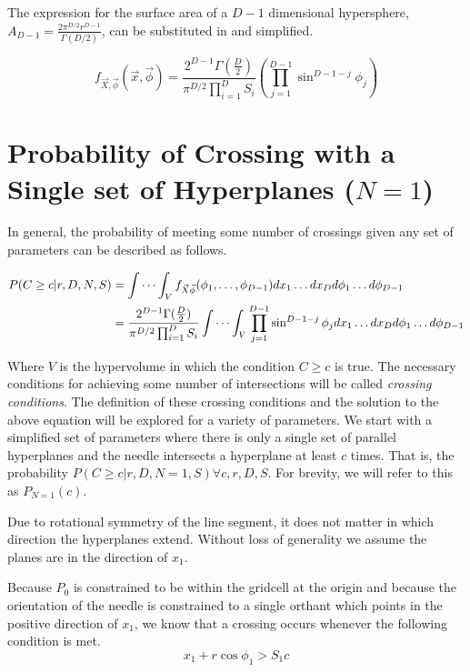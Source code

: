 \documentclass{article}
\begin{document}
The expression for the surface area of a $D-1$ dimensional hypersphere, $A_{D-1}=\frac{2\pi^{D/2}r^{D-1}}{\Gamma(D/2)}$,
can be substituted in and simplified.

\begin{equation}\label{eq:general pdf}
	f_{\vec{X},\vec{\phi}}(\vec{x}, \vec{\phi}) = \frac{2^{D-1}\Gamma(\frac{D}{2})}{\pi^{D/2}\prod_{i=1}^DS_i} \left(\prod_{j=1}^{D-1}\sin^{D-1-j}\phi_j\right)
\end{equation}

\section{Probability of Crossing with a Single set of Hyperplanes ($N=1$)} \label{s:n=1}
In general, the probability of meeting some number of crossings given any set of parameters can be described as follows.

\begin{align} 
	P(C\ge c|r, D, N, S)&=\idotsint_V f_{\vec{X}\vec\phi}(\phi_1,\hdots,\phi_{D-1})dx_1 \hdots dx_D d\phi_1 \hdots d\phi_{D-1} \label{eq:raw integral}\\
	&= \frac{2^{D-1}\Gamma(\frac{D}{2})}{\pi^{D/2}\prod_{i=1}^DS_i} \idotsint_V \prod_{j=1}^{D-1}\sin^{D-1-j}\phi_j dx_1\hdots dx_D d\phi_1 \hdots d\phi_{D-1} \label{eq:volume integral}
\end{align}

Where $V$ is the hypervolume in which the condition $C\ge c$ is true. The necessary conditions for achieving some number of intersections
will be called \emph{crossing conditions}. The definition of these crossing conditions and the solution to the above equation will be
explored for a variety of parameters.
We start with a simplified set of parameters where there is only a single set of parallel hyperplanes and the needle intersects a
hyperplane at least $c$ times. That is, the probability $P(C\ge c | r, D, N=1, S) \forall c, r, D, S$. For brevity, we will refer to this
as $P_{N=1}(c)$.

Due to rotational symmetry of the line segment, it does not matter in which direction the hyperplanes extend. Without loss of
generality we assume the planes are in the direction of $x_1$.

Because $P_0$ is constrained to be within the gridcell at the origin and because the orientation of the needle is constrained to a single
orthant which points in the positive direction of $x_1$, we know that a crossing occurs whenever the following condition is met.
\begin{equation}
	x_1 + r\cos{\phi_1} > S_1c
\end{equation}
\end{document}
